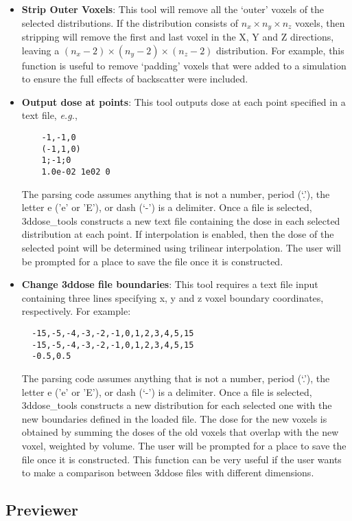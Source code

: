 \documentclass[12pt]{article}
\newcommand{\GUI}{3ddose\_tools}
\newcommand{\eg}{{\it e.g.}, }
\begin{document}
  \begin{itemize}
  \item{\bf{Strip Outer Voxels}}:
  This tool will remove all the `outer' voxels of the selected distributions.  If the distribution consists of $n_{x} \times n_{y} \times n_{z}$ voxels, then stripping will remove the first and last voxel in the X, Y and Z directions, leaving a $(n_{x}-2) \times (n_{y}-2) \times (n_{z}-2)$ distribution.  For example, this function is useful to remove `padding' voxels that were added to a simulation to ensure the full effects of backscatter were included.

  \item{\bf{Output dose at points}}:
  This tool outputs dose at each point specified in a text file, \eg
  \begin{lstlisting}
    -1,-1,0
    (-1,1,0)
    1;-1;0
    1.0e-02 1e02 0
  \end{lstlisting}
  The parsing code assumes anything that is not a number, period (`.'), the letter e ('e' or 'E'), or dash (`-') is a delimiter.  Once a file is selected, \GUI{} constructs a new text file containing the dose in each selected distribution at each point.  If interpolation is enabled, then the dose of the selected point will be determined using trilinear interpolation.  The user will be prompted for a place to save the file once it is constructed.

  \item{\bf{Change 3ddose file boundaries}}:
  This tool requires a text file input containing three lines specifying x, y and z voxel boundary coordinates, respectively.  For example:
  \begin{lstlisting}
  -15,-5,-4,-3,-2,-1,0,1,2,3,4,5,15
  -15,-5,-4,-3,-2,-1,0,1,2,3,4,5,15
  -0.5,0.5
  \end{lstlisting}
  The parsing code assumes anything that is not a number, period (`.'), the letter e ('e' or 'E'), or dash (`-') is a delimiter.   Once a file is selected, \GUI{} constructs a new distribution for each selected one with the new boundaries defined in the loaded file.  The dose for the new voxels is obtained by summing the doses of the old voxels that overlap with the new voxel, weighted by volume. The user will be prompted for a place to save the file once it is constructed.  This function can be very useful if the user wants to make a comparison between 3ddose files with different dimensions.
  \end{itemize}


  \subsection{Previewer}
\end{document}
